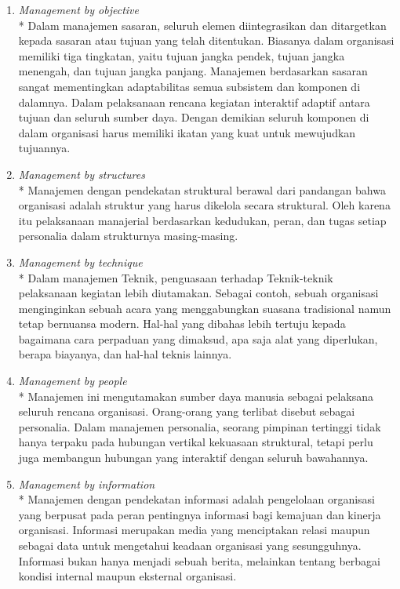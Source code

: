 \begin{enumerate}
	\item \emph{Management by objective} \\*
	Dalam manajemen sasaran, seluruh elemen diintegrasikan dan ditargetkan kepada sasaran atau tujuan yang telah ditentukan. Biasanya dalam organisasi memiliki tiga tingkatan, yaitu tujuan jangka pendek, tujuan jangka menengah, dan tujuan jangka panjang. Manajemen berdasarkan sasaran sangat mementingkan adaptabilitas semua subsistem dan komponen di dalamnya. Dalam pelaksanaan rencana kegiatan interaktif adaptif antara tujuan dan seluruh sumber daya. Dengan demikian seluruh komponen di dalam organisasi harus memiliki ikatan yang kuat untuk mewujudkan tujuannya. 
	
	\item \emph{Management by structures} \\*
	Manajemen dengan pendekatan struktural berawal dari pandangan bahwa organisasi adalah struktur yang harus dikelola secara struktural. Oleh karena itu pelaksanaan manajerial berdasarkan kedudukan, peran, dan tugas setiap personalia dalam strukturnya masing-masing.
	
	\item \emph{Management by technique} \\*
	Dalam manajemen Teknik, penguasaan terhadap Teknik-teknik pelaksanaan kegiatan lebih diutamakan. Sebagai contoh, sebuah organisasi menginginkan sebuah acara yang menggabungkan suasana tradisional namun tetap bernuansa modern. Hal-hal yang dibahas lebih tertuju kepada bagaimana cara perpaduan yang dimaksud, apa saja alat yang diperlukan, berapa biayanya, dan hal-hal teknis lainnya.
	
	\item \emph{Management by people} \\*
	Manajemen ini mengutamakan sumber daya manusia sebagai pelaksana seluruh rencana organisasi. Orang-orang yang terlibat disebut sebagai personalia. Dalam manajemen personalia, seorang pimpinan tertinggi tidak hanya terpaku pada hubungan vertikal kekuasaan struktural, tetapi perlu juga membangun hubungan yang interaktif dengan seluruh bawahannya.
	
	\item \emph{Management by information} \\*
	Manajemen dengan pendekatan informasi adalah pengelolaan organisasi yang berpusat pada peran pentingnya informasi bagi kemajuan dan kinerja organisasi. Informasi merupakan media yang menciptakan relasi maupun sebagai data untuk mengetahui keadaan organisasi yang sesungguhnya. Informasi bukan hanya menjadi sebuah berita, melainkan tentang berbagai kondisi internal maupun eksternal organisasi.
	

\end{enumerate}

